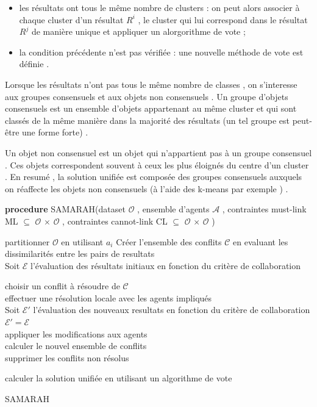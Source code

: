 \documentclass[11pt, openany]{report}
\begin{document}
\begin{itemize}
	\item les résultats ont tous le même nombre de clusters  : on peut alors associer à chaque cluster d'un résultat $R^i$ , le cluster qui lui correspond dans le résultat $R^j$  de manière unique  et appliquer un alorgorithme de vote ;
	\item la condition précédente n'est pas vérifiée : une nouvelle méthode de vote est définie .\\
\end{itemize}
Lorsque les résultats n'ont pas tous le même nombre de classes , on s'interesse aux groupes consensuels et aux objets non consensuels .
Un groupe d'objets consensuels est un ensemble d'objets appartenant au même cluster et qui sont classés de la même manière dans la majorité des résultats (un tel groupe est peut-être une forme forte) . \par
Un objet non consensuel est un objet qui n'appartient pas à un groupe consensuel . Ces objets correspondent souvent à ceux les plus éloignés du centre d'un cluster .
\newline
En resumé , la solution unifiée est composée des groupes consensuels auxquels on réaffecte les objets non consensuels (à l'aide des k-means par exemple ) .
\newline
\newline
\begin{algorithm}[H]
\textbf{procedure} SAMARAH(dataset $\mathcal{O}$ , ensemble d'agents $\mathcal{A}$ , contraintes must-link ML  $\subseteq$  $\mathcal{O}$   $\times$  $\mathcal{O}$ , contraintes cannot-link CL $\subseteq$  $\mathcal{O}$   $\times$  $\mathcal{O}$   )

        { 
        	partitionner  $\mathcal{O}$ en utilisant $a_i$
        }
  Créer l'ensemble des conflits  $\mathcal{C}$ en evaluant les dissimilarités entre les pairs de resultats \\
  Soit $\mathcal{E}$ l'évaluation des résultats initiaux en fonction du critère de collaboration\\
   {
   		choisir un conflit à résoudre de $\mathcal{C}$ \\
   		effectuer une résolution locale avec les agents impliqués \\
   		Soit $\mathcal{E}'$ l'évaluation des nouveaux resultats en fonction du critère de collaboration \\
    	{
       		$\mathcal{E'}  =  \mathcal{E}$ \\
       		appliquer les modifications aux agents \\
       		calculer le nouvel ensemble de conflits \\
       		supprimer les conflits non résolus \\
   		}
   		
   		
   }
 
 calculer la  solution unifiée en utilisant un algorithme de vote
\caption{SAMARAH}
\end{algorithm}
\end{document}
